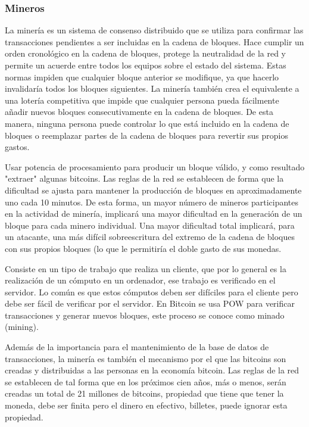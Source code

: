 \documentclass[12pt,letterpaper]{article}
\begin{document}
		\subsubsection*{Mineros}
		La miner\'ia es un sistema de consenso distribuido que se utiliza para confirmar las transacciones pendientes a ser incluidas en la cadena de bloques. Hace cumplir un orden cronol\'ogico en la cadena de bloques, protege la neutralidad de la red y permite un acuerde entre todos los equipos sobre el estado del sistema. 
		Estas normas impiden que cualquier bloque anterior se modifique, ya que hacerlo invalidar\'ia todos los bloques siguientes. La miner\'ia tambi\'en crea el equivalente a una loter\'ia competitiva que impide que cualquier persona pueda f\'acilmente añadir nuevos bloques consecutivamente en la cadena de bloques. 
		De esta manera, ninguna persona puede controlar lo que est\'a incluido en la cadena de bloques o reemplazar partes de la cadena de bloques para revertir sus propios gastos.
		
Usar potencia de procesamiento para producir un bloque v\'alido, y como resultado "extraer" algunas bitcoins. Las reglas de la red se establecen de forma que la dificultad se ajusta para mantener la producci\'on de bloques en aproximadamente uno cada 10 minutos. De esta forma, un mayor n\'umero de mineros participantes en la actividad de miner\'ia, implicar\'a una mayor dificultad en la generaci\'on de un bloque para cada minero individual. Una mayor dificultad total implicar\'a, para un atacante, una m\'as dif\'icil sobreescritura del extremo de la cadena de bloques con sus propios bloques (lo que le permitir\'ia el doble gasto de sus monedas.

Consiste en un tipo de trabajo que realiza un cliente, que por lo general es la realizaci\'on de un c\'omputo en un ordenador, ese trabajo es verificado en el servidor. Lo com\'un es que estos c\'omputos deben ser dif\'iciles para el cliente pero debe ser f\'acil de verificar por el servidor. En Bitcoin se usa POW para verificar transacciones y generar nuevos bloques, este proceso se conoce como minado (mining).

Adem\'as de la importancia para el mantenimiento de la base de datos de transacciones, la miner\'ia es tambi\'en el mecanismo por el que las bitcoins son creadas y distribuidas a las personas en la econom\'ia bitcoin. Las reglas de la red se establecen de tal forma que en los pr\'oximos cien años,  m\'as o menos, ser\'an creadas un total de 21 millones de bitcoins, propiedad que tiene que tener la moneda, debe ser finita pero el dinero en efectivo, billetes, puede ignorar esta propiedad.
\end{document}
